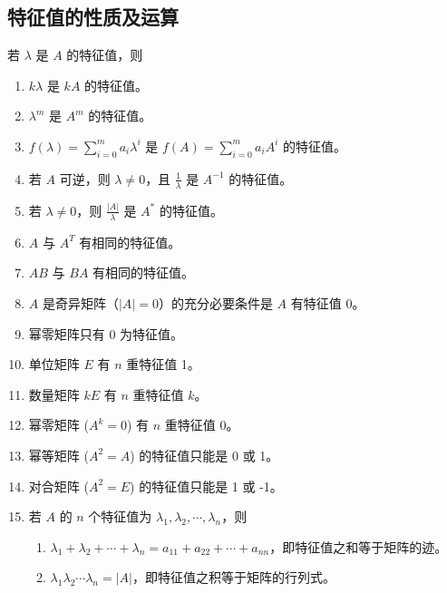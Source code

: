 \documentclass[UTF8]{ctexart}
\theoremstyle{mydef}
\begin{document}
\subsection{特征值的性质及运算}
若 $\lambda$ 是 $A$ 的特征值，则
\begin{enumerate}
    \item $k\lambda$ 是 $kA$ 的特征值。
    \item $\lambda^m$ 是 $A^m$ 的特征值。
    \item $f(\lambda) = \sum_{i=0}^m a_i \lambda^i$ 是 $f(A) = \sum_{i=0}^m a_i A^i$ 的特征值。
    \item 若 $A$ 可逆，则 $\lambda \neq 0$，且 $\frac{1}{\lambda}$ 是 $A^{-1}$ 的特征值。
    \item 若 $\lambda \neq 0$，则 $\frac{|A|}{\lambda}$ 是 $A^*$ 的特征值。
    \item $A$ 与 $A^T$ 有相同的特征值。
    \item $AB$ 与 $BA$ 有相同的特征值。
    \item $A$ 是奇异矩阵（$|A|=0$）的充分必要条件是 $A$ 有特征值 0。
    \item 幂零矩阵只有 0 为特征值。
    \item 单位矩阵 $E$ 有 $n$ 重特征值 1。
    \item 数量矩阵 $kE$ 有 $n$ 重特征值 $k$。
    \item 幂零矩阵 ($A^k=0$) 有 $n$ 重特征值 0。
    \item 幂等矩阵 ($A^2=A$) 的特征值只能是 0 或 1。
    \item 对合矩阵 ($A^2=E$) 的特征值只能是 1 或 -1。
    \item 若 $A$ 的 $n$ 个特征值为 $\lambda_1, \lambda_2, \cdots, \lambda_n$，则
    \begin{enumerate}
        \item $\lambda_1 + \lambda_2 + \cdots + \lambda_n = a_{11} + a_{22} + \cdots + a_{nn}$，即特征值之和等于矩阵的迹。
        \item $\lambda_1 \lambda_2 \cdots \lambda_n = |A|$，即特征值之积等于矩阵的行列式。
    \end{enumerate}
\end{enumerate}
\end{document}
